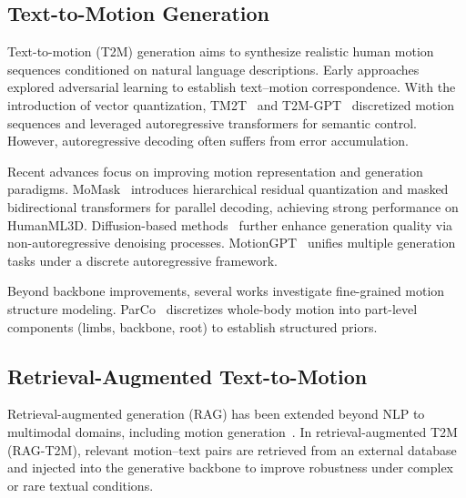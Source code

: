 \documentclass[10pt,journal,compsoc]{IEEEtran}
\begin{document}
\subsection{Text-to-Motion Generation}

Text-to-motion (T2M) generation aims to synthesize realistic human motion sequences conditioned on natural language descriptions. Early approaches explored adversarial learning to establish text–motion correspondence. With the introduction of vector quantization, TM2T~\cite{tm2t} and T2M-GPT~\cite{t2m-gpt} discretized motion sequences and leveraged autoregressive transformers for semantic control. However, autoregressive decoding often suffers from error accumulation.

Recent advances focus on improving motion representation and generation paradigms. MoMask~\cite{momask} introduces hierarchical residual quantization and masked bidirectional transformers for parallel decoding, achieving strong performance on HumanML3D. Diffusion-based methods~\cite{ddpms,motiongpt} further enhance generation quality via non-autoregressive denoising processes. MotionGPT~\cite{motiongpt} unifies multiple generation tasks under a discrete autoregressive framework. 

Beyond backbone improvements, several works investigate fine-grained motion structure modeling. ParCo~\cite{parco} discretizes whole-body motion into part-level components (limbs, backbone, root) to establish structured priors.








\subsection{Retrieval-Augmented Text-to-Motion}

Retrieval-augmented generation (RAG) has been extended beyond NLP to multimodal domains, including motion generation~\cite{rmd,remodiffuse,morag,remogpt}. In retrieval-augmented T2M (RAG-T2M), relevant motion–text pairs are retrieved from an external database and injected into the generative backbone to improve robustness under complex or rare textual conditions. 
\end{document}
